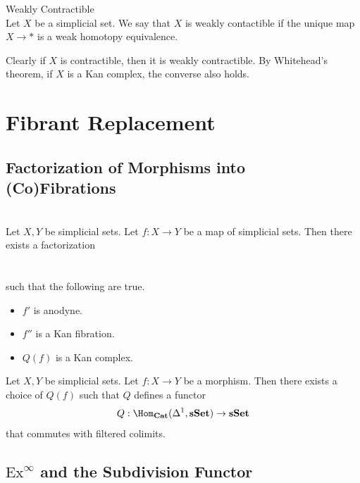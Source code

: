 \documentclass[a4paper]{article}
\begin{document}
\begin{defn}{Weakly Contractible}{}\\
Let $X$ be a simplicial set. We say that $X$ is weakly contactible if the unique map $X\to\ast$ is a weak homotopy equivalence. 
\end{defn}

Clearly if $X$ is contractible, then it is weakly contractible. By Whitehead's theorem, if $X$ is a Kan complex, the converse also holds. 

\pagebreak
\section{Fibrant Replacement}
\subsection{Factorization of Morphisms into (Co)Fibrations}
\begin{prp}{}{}\\
Let $X,Y$ be simplicial sets. Let $f:X\to Y$ be a map of simplicial sets. Then there exists a factorization \\~\\
\\
such that the following are true. 
\begin{itemize}
\item $f'$ is anodyne. 
\item $f''$ is a Kan fibration. 
\item $Q(f)$ is a Kan complex. 
\end{itemize}
\end{prp}

\begin{prp}{}{} Let $X,Y$ be simplicial sets. Let $f:X\to Y$ be a morphism. Then there exists a choice of $Q(f)$ such that $Q$ defines a functor $$Q:\Hom_\bold{Cat}(\Delta^1,\bold{sSet})\to\bold{sSet}$$ that commutes with filtered colimits. 
\end{prp}

\subsection{$\text{Ex}^\infty$ and the Subdivision Functor}
\end{document}
